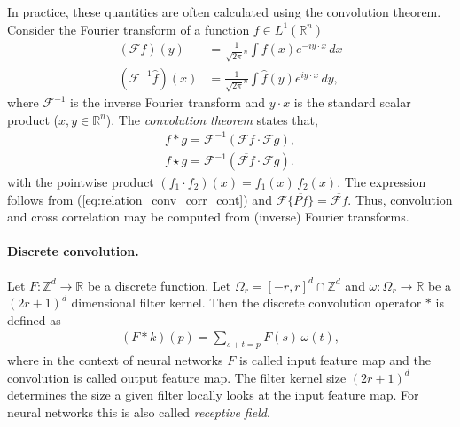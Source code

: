\documentclass[12pt,a4paper]{article}
\begin{document}
In practice, these quantities are often calculated using the convolution theorem. Consider the Fourier transform of a function $f \in L^1(\mathbb R ^n) $
\begin{align}
	 (\mathcal F f)(y) &= \frac{1}{\sqrt{2\pi}^n } \int f(x) e^{-iy\cdot x}\, dx \\
	 (\mathcal F^{-1} \hat f)(x) &= \frac{1}{\sqrt{2\pi}^n } \int \hat f(y) e^{iy\cdot x}\, dy,
\end{align}
where $\mathcal F^{-1} $ is the inverse Fourier transform and $y\cdot x$ is the standard scalar product ($x, y \in \mathbb R ^n$). The \textit{convolution theorem} states that, 
\begin{align}
	f * g = \mathcal F^{-1} (\mathcal F f \cdot  \mathcal F g), \\
    f \star g = \mathcal F^{-1} (\overline{\mathcal F f} \cdot  \mathcal F g).
\end{align}
with the pointwise product  $(f_1 \cdot f_2)(x) = f_1(x) \, f_2(x) $. The expression follows from (\ref{eq:relation_conv_corr_cont}) and $\mathcal F\{\overline{Pf}\} = \overline{\mathcal F f}$. Thus, convolution and cross correlation may be computed from (inverse) Fourier transforms.


\paragraph{Discrete convolution.} Let $F: \mathbb{Z}^d \rightarrow \mathbb{R}$ be a discrete function. Let $\Omega_r = [-r, r]^d \cap \mathbb{Z}^d$ and $\omega: \Omega_r \rightarrow \mathbb{R}$ be a $(2r + 1)^d$ dimensional filter kernel. Then the discrete convolution operator $*$ is defined as \cite{yu2016multiscale, dumoulin2018guide}
\begin{align}
	(F * k)(p) = \sum_{s+t = p}F(s)\, \omega(t),
\end{align}
where in the context of neural networks $F$ is called input feature map and the convolution is called output feature map. The filter kernel size $(2r + 1)^d$  determines the size a given filter locally looks at the input feature map. For neural networks this is also called \textit{receptive field}.
\end{document}
